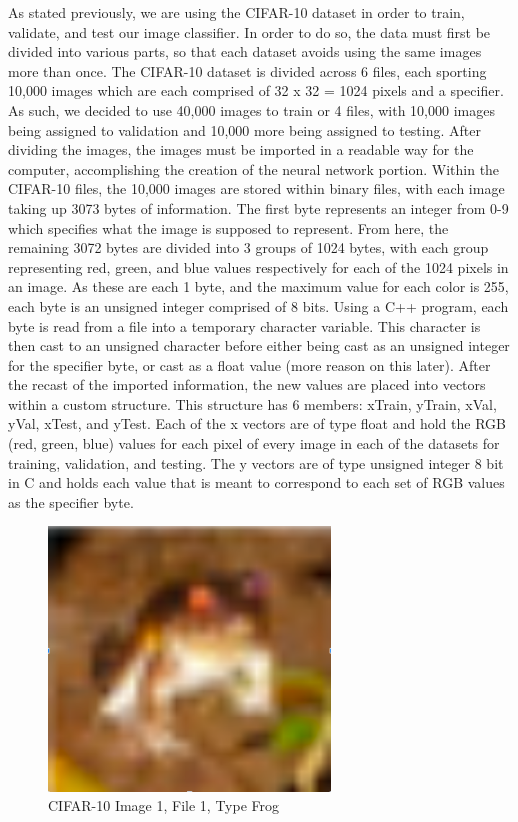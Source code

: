 \documentclass[conference]{IEEEtran}
\begin{document}
As stated previously, we are using the CIFAR-10 dataset\cite{b2} in order to train, validate, and test our image classifier. In order to do so, the data must first be divided into various parts, so that each dataset avoids using the same images more than once. The CIFAR-10 dataset is divided across 6 files, each sporting 10,000 images which are each comprised of 32 x 32 = 1024 pixels and a specifier. As such, we decided to use 40,000 images to train or 4 files, with 10,000 images being assigned to validation and 10,000 more being assigned to testing. After dividing the images, the images must be imported in a readable way for the computer, accomplishing the creation of the neural network portion. Within the CIFAR-10 files, the 10,000 images are stored within binary files, with each image taking up 3073 bytes of information. The first byte represents an integer from 0-9 which specifies what the image is supposed to represent. From here, the remaining 3072 bytes are divided into 3 groups of 1024 bytes, with each group representing red, green, and blue values respectively for each of the 1024 pixels in an image. As these are each 1 byte, and the maximum value for each color is 255, each byte is an unsigned integer comprised of 8 bits. Using a C++ program, each byte is read from a file into a temporary character variable. This character is then cast to an unsigned character before either being cast as an unsigned integer for the specifier byte, or cast as a float value (more reason on this later). After the recast of the imported information, the new values are placed into vectors within a custom structure. This structure has 6 members: xTrain, yTrain, xVal, yVal, xTest, and yTest. Each of the x vectors are of type float and hold the RGB (red, green, blue) values for each pixel of every image in each of the datasets for training, validation, and testing. The y vectors are of type unsigned integer 8 bit in C and holds each value that is meant to correspond to each set of RGB values as the specifier byte.

\begin{figure}[htbp]
\centerline{\includegraphics[width=75mm]{frog_cifar.png}}
\caption{CIFAR-10 Image 1, File 1, Type Frog}
\label{frog}
\end{figure}
\end{document}
